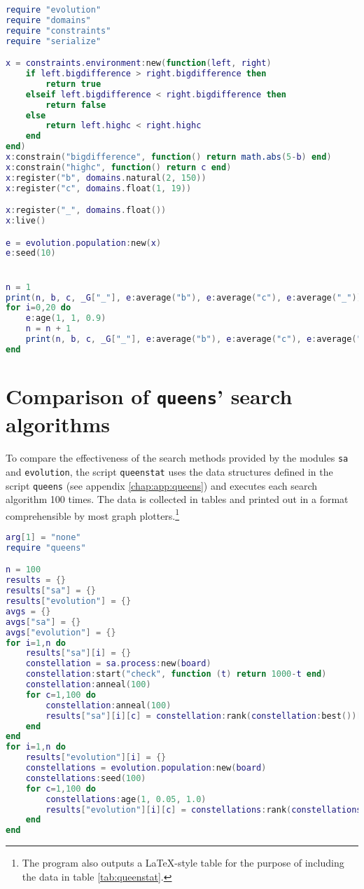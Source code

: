 \begin{appendices}
\begin{lstlisting}[language=lua, caption={Test program for self-adaptation of the mutation rate in the module \texttt{evolution}}, label=lst:adaptationperformance, name=lst:adaptationperformance]
require "evolution"
require "domains"
require "constraints"
require "serialize"

x = constraints.environment:new(function(left, right)
	if left.bigdifference > right.bigdifference then
		return true
	elseif left.bigdifference < right.bigdifference then
		return false
	else
		return left.highc < right.highc
	end
end)
x:constrain("bigdifference", function() return math.abs(5-b) end)
x:constrain("highc", function() return c end)
x:register("b", domains.natural(2, 150))
x:register("c", domains.float(1, 19))

x:register("_", domains.float())
x:live()

e = evolution.population:new(x)
e:seed(10)


n = 1
print(n, b, c, _G["_"], e:average("b"), e:average("c"), e:average("_"))
for i=0,20 do
    e:age(1, 1, 0.9)
    n = n + 1
    print(n, b, c, _G["_"], e:average("b"), e:average("c"), e:average("_"))
end
\end{lstlisting}


\section{Comparison of \texttt{queens}' search algorithms}
\label{sec:app:queensperformance}

To compare the effectiveness of the search methods provided by the modules \texttt{sa} and \texttt{evolution}, the script \texttt{queenstat} uses the data structures defined in the script \texttt{queens} (see appendix \ref{chap:app:queens}) and executes each search algorithm 100 times. The data is collected in tables and printed out in a format comprehensible by most graph plotters.\footnote{The program also outputs a \LaTeX-style table for the purpose of including the data in table \ref{tab:queenstat}.}

\begin{lstlisting}[language=lua, caption={Test program \texttt{queenstat} for collecting statistical data about the search methods used in \texttt{queens} (see appendix \ref{chap:app:queens})}, label=lst:queenstat, name=lst:queenstat]
arg[1] = "none"
require "queens"

n = 100
results = {}
results["sa"] = {}
results["evolution"] = {}
avgs = {}
avgs["sa"] = {}
avgs["evolution"] = {}
for i=1,n do
    results["sa"][i] = {}
    constellation = sa.process:new(board)
    constellation:start("check", function (t) return 1000-t end)
    constellation:anneal(100)
    for c=1,100 do
        constellation:anneal(100)
        results["sa"][i][c] = constellation:rank(constellation:best())["check"]
    end
end
for i=1,n do
    results["evolution"][i] = {}
    constellations = evolution.population:new(board)
    constellations:seed(100)
    for c=1,100 do
        constellations:age(1, 0.05, 1.0)
        results["evolution"][i][c] = constellations:rank(constellations:best())["check"]
    end
end


\end{lstlisting}
\end{appendices}
